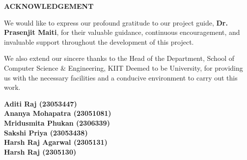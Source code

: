 {}
\begin{center}
  {\LARGE \textbf{ACKNOWLEDGEMENT}}\\[1cm]
\end{center}

\noindent We would like to express our profound gratitude to our project guide, \textbf{Dr. Prasenjit Maiti}, for their valuable guidance, continuous encouragement, and invaluable support throughout the development of this project.

\par\vspace{0.5cm}

\noindent We also extend our sincere thanks to the Head of the Department, School of Computer Science \& Engineering, KIIT Deemed to be University, for providing us with the necessary facilities and a conducive environment to carry out this work.

\vfill
\begin{flushright}
  \textbf{Aditi Raj (23053447)}\\[0.15cm]
  \textbf{Ananya Mohapatra (23051081)}\\[0.15cm]
  \textbf{Mridusmita Phukan (2306339)}\\[0.15cm]
  \textbf{Sakshi Priya (23053438)}\\[0.15cm]
  \textbf{Harsh Raj Agarwal (2305131)}\\[0.15cm]
  \textbf{Harsh Raj (2305130)}
\end{flushright}
\clearpage
